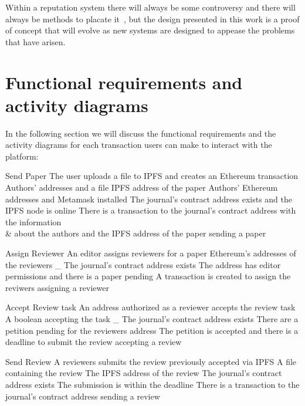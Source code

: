 Within a reputation system there will always be some controversy and there will
always be methods to placate it~\cite{dellarocas2000immunizing}, but the design
presented in this work is a proof of concept that will evolve as new systems are
designed to appease the problems that have arisen.


\section{Functional requirements and activity diagrams}
\label{sec:funct-requ-activ}

In the following section we will discuss the functional requirements and the
activity diagrams for each transaction users can make to interact with the
platform:


{Send Paper}%
{The user uploads a file to IPFS and creates an Ethereum
  transaction}%
{Authors' addresses and a file}%
{IPFS address of the paper}%
{Authors' Ethereum addresses and Metamask installed}%
{The journal's contract address exists and the IPFS node is
  online}%
{There is a transaction to the journal's contract address with the information\\
  & about the authors and the IPFS address of the paper }%
{sending a paper}%

{Assign Reviewer}%
{An editor assigns reviewers for a paper}%
{Ethereum's addresses of the reviewers}%
{_}%
{The journal's contract address exists} {The address has editor permissions and
  there is a paper pending}%
{A transaction is created to assign the reviwers}%
{assigning a reviewer}%

{Accept Review task}%
{An address authorized as a reviewer accepts the review
  task}%
{A boolean accepting the task}%
{_}%
{The journal's contract address exists}%
{There are a petition pending for the reviewers address}%
{The petition is accepted and there is a deadline to submit the
  review}%
{accepting a review}%

{Send Review}%
{A reviewers submits the review previously accepted via
  IPFS}%
{A file containing the review}%
{The IPFS address of the review}%
{The journal's contract address exists}%
{The submission is within the deadline}%
{There is a transaction to the journal's contract address}%
{sending a review}%

